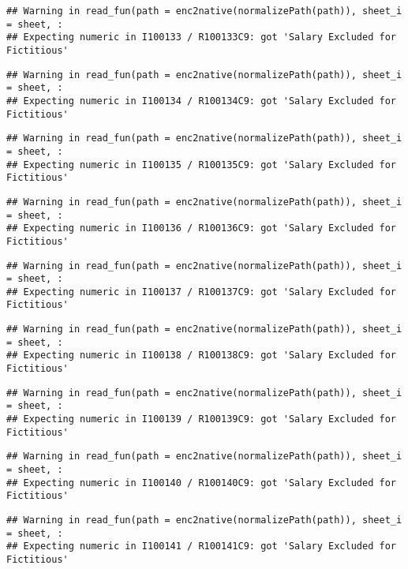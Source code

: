 \documentclass[
]{article}
\begin{document}
\begin{verbatim}
## Warning in read_fun(path = enc2native(normalizePath(path)), sheet_i = sheet, :
## Expecting numeric in I100133 / R100133C9: got 'Salary Excluded for Fictitious'
\end{verbatim}

\begin{verbatim}
## Warning in read_fun(path = enc2native(normalizePath(path)), sheet_i = sheet, :
## Expecting numeric in I100134 / R100134C9: got 'Salary Excluded for Fictitious'
\end{verbatim}

\begin{verbatim}
## Warning in read_fun(path = enc2native(normalizePath(path)), sheet_i = sheet, :
## Expecting numeric in I100135 / R100135C9: got 'Salary Excluded for Fictitious'
\end{verbatim}

\begin{verbatim}
## Warning in read_fun(path = enc2native(normalizePath(path)), sheet_i = sheet, :
## Expecting numeric in I100136 / R100136C9: got 'Salary Excluded for Fictitious'
\end{verbatim}

\begin{verbatim}
## Warning in read_fun(path = enc2native(normalizePath(path)), sheet_i = sheet, :
## Expecting numeric in I100137 / R100137C9: got 'Salary Excluded for Fictitious'
\end{verbatim}

\begin{verbatim}
## Warning in read_fun(path = enc2native(normalizePath(path)), sheet_i = sheet, :
## Expecting numeric in I100138 / R100138C9: got 'Salary Excluded for Fictitious'
\end{verbatim}

\begin{verbatim}
## Warning in read_fun(path = enc2native(normalizePath(path)), sheet_i = sheet, :
## Expecting numeric in I100139 / R100139C9: got 'Salary Excluded for Fictitious'
\end{verbatim}

\begin{verbatim}
## Warning in read_fun(path = enc2native(normalizePath(path)), sheet_i = sheet, :
## Expecting numeric in I100140 / R100140C9: got 'Salary Excluded for Fictitious'
\end{verbatim}

\begin{verbatim}
## Warning in read_fun(path = enc2native(normalizePath(path)), sheet_i = sheet, :
## Expecting numeric in I100141 / R100141C9: got 'Salary Excluded for Fictitious'
\end{verbatim}
\end{document}

